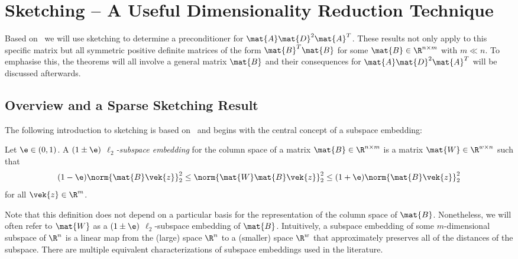 \chapter{Sketching -- A Useful Dimensionality Reduction Technique}\label{chap:sketching}

Based on~\cite{Avron-FasterRandomizedInfeasibleIPMs} we will use sketching to determine a preconditioner for \(\mat{A} \mat{D}^2 \mat{A}^T\).
These results not only apply to this specific matrix but all symmetric positive definite matrices of the form \(\mat{B}^T \mat{B}\) for some \(\mat{B} \in \R^{n \times m}\) with \(m \ll n\).
To emphasise this, the theorems will all involve a general matrix \(\mat{B}\) and their consequences for \(\mat{A}\mat{D}^2\mat{A}^T\) will be discussed afterwards.

\section{Overview and a Sparse Sketching Result}\label{sec:sketching-overview}

The following introduction to sketching is based on~\cite{Woodruff-Sketching} and begins with the central concept of a subspace embedding:
\begin{definition}\label{def:subspace-embedding}
Let \(\e \in (0, 1)\). A \emph{\((1 \pm \e)\) \(\ell_2\)-subspace embedding} for the column space of a matrix \(\mat{B} \in \R^{n \times m}\) is a matrix \(\mat{W} \in \R^{w \times n}\) such that
\[ (1-\e) \norm{\mat{B}\vek{z}}_2^2 \leq \norm{\mat{W}\mat{B}\vek{z}}_2^2 \leq (1+\e)\norm{\mat{B}\vek{z}}_2^2 \]
for all \(\vek{z} \in \R^m\).
\end{definition}
Note that this definition does not depend on a particular basis for the representation of the column space of \(\mat{B}\).
Nonetheless, we will often refer to \(\mat{W}\) as a \((1\pm\e)\) \(\ell_2\)-subspace embedding of \(\mat{B}\).
Intuitively, a subspace embedding of some \(m\)-dimensional subspace of \(\R^n\) is a linear map from the (large) space \(\R^n\) to a (smaller) space \(\R^w\) that approximately preserves all of the distances of the subspace.
There are multiple equivalent characterizations of subspace embeddings used in the literature.

